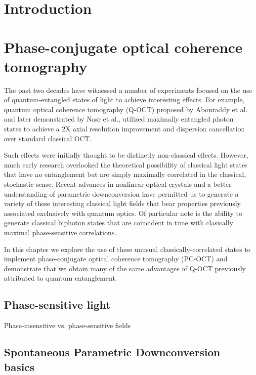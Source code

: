 \documentclass{report}
\begin{document}
\tableofcontents{}

\chapter{Introduction}

\chapter{Phase-conjugate optical coherence tomography}

The past two decades have witnessed a number of experiments focused on the use of quantum-entangled states of light to achieve interesting effects. For example, quantum optical coherence tomography (Q-OCT) proposed by Abouraddy et al. and later demonstrated by Nasr et al., utilized maximally entangled photon states to achieve a 2X axial resolution improvement and dispersion cancellation over standard classical OCT.

Such effects were initially thought to be distinctly non-classical effects. However, much early research overlooked the theoretical possibility of classical light states that have no entanglement but are simply maximally correlated in the classical, stochastic sense. Recent advances in nonlinear optical crystals and a better understanding of parametric downconversion have permitted us to generate a variety of these interesting classical light fields that bear properties previously associated exclusively with quantum optics. Of particular note is the ability to generate classical biphoton states that are coincident in time with clasically maximal phase-sensitive correlations.

In this chapter we explore the use of these unusual classically-correlated states to implement phase-conjugate optical coherence tomography (PC-OCT) and demonstrate that we obtain many of the same advantages of Q-OCT previously attributed to quantum entanglement.

\section{Phase-sensitive light}

Phase-insensitive vs. phase-sensitive fields

\section{Spontaneous Parametric Downconversion basics}
\end{document}
